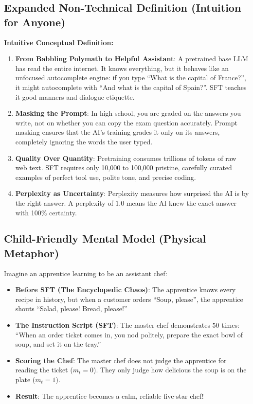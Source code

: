\documentclass[11pt,a4paper]{article}
\theoremstyle{definition}
\begin{document}
\subsection{Expanded Non-Technical Definition (Intuition for Anyone)}
\textbf{Intuitive Conceptual Definition:}
\begin{enumerate}
    \item \textbf{From Babbling Polymath to Helpful Assistant}: A pretrained base LLM has read the entire internet. It knows everything, but it behaves like an unfocused autocomplete engine: if you type ``What is the capital of France?'', it might autocomplete with ``And what is the capital of Spain?''. SFT teaches it good manners and dialogue etiquette.
    \item \textbf{Masking the Prompt}: In high school, you are graded on the answers you write, not on whether you can copy the exam question accurately. Prompt masking ensures that the AI's training grades it only on its answers, completely ignoring the words the user typed.
    \item \textbf{Quality Over Quantity}: Pretraining consumes trillions of tokens of raw web text. SFT requires only 10,000 to 100,000 pristine, carefully curated examples of perfect tool use, polite tone, and precise coding.
    \item \textbf{Perplexity as Uncertainty}: Perplexity measures how surprised the AI is by the right answer. A perplexity of $1.0$ means the AI knew the exact answer with 100\% certainty.
\end{enumerate}

\subsection{Child-Friendly Mental Model (Physical Metaphor)}
Imagine an apprentice learning to be an assistant chef:
\begin{itemize}
    \item \textbf{Before SFT (The Encyclopedic Chaos)}: The apprentice knows every recipe in history, but when a customer orders ``Soup, please'', the apprentice shouts ``Salad, please! Bread, please!''
    \item \textbf{The Instruction Script (SFT)}: The master chef demonstrates 50 times: ``When an order ticket comes in, you nod politely, prepare the exact bowl of soup, and set it on the tray.''
    \item \textbf{Scoring the Chef}: The master chef does not judge the apprentice for reading the ticket ($m_t = 0$). They only judge how delicious the soup is on the plate ($m_t = 1$).
    \item \textbf{Result}: The apprentice becomes a calm, reliable five-star chef!
\end{itemize}
\end{document}
